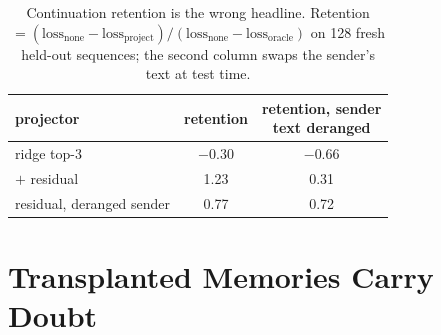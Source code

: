 \documentclass{article}
\begin{document}
\begin{table}[t]
\caption{Continuation retention is the wrong headline. Retention $= (\mathrm{loss}_{\text{none}} - \mathrm{loss}_{\text{project}}) / (\mathrm{loss}_{\text{none}} - \mathrm{loss}_{\text{oracle}})$ on 128 fresh held-out sequences; the second column swaps the sender's text at test time.}
\label{tab:retention}
\vskip 0.1in
\begin{center}
\begin{small}
\begin{tabular}{lcc}
\toprule
projector & retention & \shortstack{retention, sender\\text deranged} \\
\midrule
ridge top-3                          & $-0.30$ & $-0.66$ \\
$+$ residual                         & 1.23    & 0.31 \\
residual, deranged sender & 0.77    & 0.72 \\
\bottomrule
\end{tabular}
\end{small}
\end{center}
\vskip -0.1in
\end{table}
\begin{table}[t]
\caption{Where the binding lives. This episode's mapped cache is injected only into a band of receiver layers, the deranged episode's elsewhere. 8-name variant, $n = 500$ per band; ``all'' is the full mapped cache on the same test, $n = 1000$; accuracy in percent, chance 12.5.}
\label{tab:layers}
\vskip 0.1in
\begin{center}
\begin{footnotesize}
\end{footnotesize}
\end{center}
\vskip -0.1in
\end{table}
\section{Transplanted Memories Carry Doubt}
\label{sec:survive}
\end{document}
